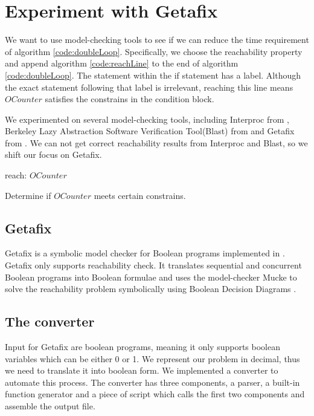 \chapter{Experiment with Getafix}
	\label{CH_03}

We want to use model-checking tools to see if we can reduce the time requirement of algorithm \ref{code:doubleLoop}. Specifically, we choose the reachability property and append algorithm \ref{code:reachLine} to the end of algorithm \ref{code:doubleLoop}. The statement within the if statement has a label. Although the exact statement following that label is irrelevant, reaching this line means $OCounter$ satisfies the constrains in the condition block.

We experimented on several model-checking tools, including Interproc from \cite{_interproc_2011}, Berkeley Lazy Abstraction Software Verification Tool(Blast) from \cite{_mtc_2008} and Getafix from \cite{la_torre_analyzing_2009}. We can not get correct reachability results from Interproc and Blast, so we shift our focus on Getafix.

\renewcommand{\algorithmiccomment}[1]{// #1}
\begin{algorithm}
\begin{algorithmic}

\STATE reach: $OCounter$
\ENDIF

\end{algorithmic}

\caption[Single loop]{Determine if $OCounter$ meets certain constrains.}
\label{code:reachLine}
\end{algorithm}

\section{Getafix}
Getafix is a symbolic model checker for Boolean programs implemented in \cite{la_torre_analyzing_2009}. Getafix only supports reachability check. It translates sequential and concurrent Boolean programs into Boolean formulae and uses the model-checker Mucke to solve the reachability problem symbolically using Boolean Decision Diagrams \cite{_getafix_2009}. 

\section{The converter}
Input for Getafix are boolean programs, meaning it only supports boolean variables which can be either 0 or 1. We represent our problem in decimal, thus we need to translate it into boolean form. We implemented a converter to automate this process. The converter has three components, a parser, a built-in function generator and a piece of script which calls the first two components and assemble the output file.

